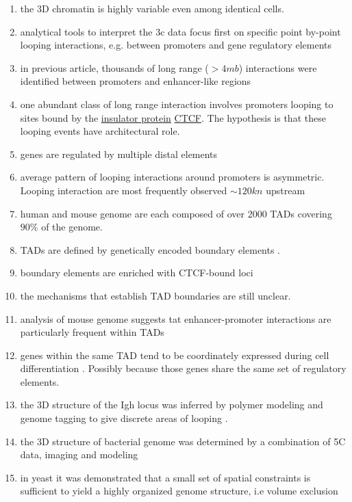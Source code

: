 \documentclass[12pt]{book}
\begin{document}
\begin{enumerate}
\begin{enumerate}
\end{enumerate}
\item the 3D chromatin is highly variable even among identical cells\cite{marshall1997interphase}.
\item analytical tools to interpret the 3c data focus first on specific point by-point looping interactions, e.g. between promoters and gene regulatory elements
\item in previous article, thousands of long range ($>4mb$) interactions were identified between promoters and enhancer-like regions \cite{sanyal2012long}
\item one abundant class of long range interaction involves promoters looping to sites bound by the \href{http://en.wikipedia.org/wiki/Insulator_(genetics)}{insulator protein} \href{http://en.wikipedia.org/wiki/CTCF}{CTCF}. The hypothesis is that these looping events have architectural role. 
\item genes are regulated by multiple distal elements \cite{gerstein2012architecture}
\item average pattern of looping interactions around promoters is asymmetric. Looping interaction are most frequently observed $\sim120kn$ upstream
\item human and mouse genome are each composed of over 2000 TADs covering $90\%$ of the genome.
\item TADs are defined by genetically encoded boundary elements \cite{nora2012spatial}.
\item boundary elements are enriched with CTCF-bound loci
\item the mechanisms that establish TAD boundaries are still unclear. 
\item analysis of mouse genome suggests tat enhancer-promoter interactions are particularly frequent within TADs \cite{shen2012map}
\item genes within the same TAD tend to be coordinately expressed during cell differentiation \cite{nora2012spatial}. Possibly because those genes share the same set of regulatory elements. 
\item the 3D structure of the Igh locus was inferred by polymer modeling and genome tagging to give discrete areas of looping \cite{jhunjhunwala20083d}.
\item the 3D structure of bacterial genome was determined by a combination of 5C data, imaging and modeling \cite{umbarger2011three}
\item in yeast it was demonstrated that a small set of spatial constraints is sufficient to yield a highly organized genome structure, i.e volume exclusion \cite{tjong2012physical}

\end{enumerate}
\end{document}
